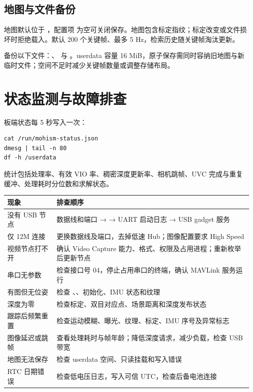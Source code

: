 \subsection{地图与文件备份}
地图默认位于 ，配置项  为空可关闭保存。地图包含标定指纹；标定改变或文件损坏时拒绝载入。默认 200 个关键帧、最多 5 Hz，检索历史随关键帧淘汰更新。

备份以下文件：、 与 。userdata 容量 16 MiB，原子保存需同时容纳旧地图与新临时文件；空间不足时减少关键帧数量或调整存储布局。
\newpage
\section{状态监测与故障排查}
板端状态每 5 秒写入一次：
\begin{lstlisting}
cat /run/mohism-status.json
dmesg | tail -n 80
df -h /userdata
\end{lstlisting}
统计包括处理率、有效 VIO 率、稠密深度更新率、相机跳帧、UVC 完成与重复缓冲、处理耗时分位数和求解状态。

\par\noindent\begin{tabularx}{\linewidth}{@{}p{30mm}Y@{}}\toprule
现象 & 排查顺序\\\midrule
没有 USB 节点 & 数据线和端口 →  → UART 启动日志 → USB gadget 服务\\
仅 12M 连接 & 更换数据线及端口，去掉低速 Hub；图像配置要求 High Speed\\
视频节点打不开 & 确认 Video Capture 能力、格式、权限及占用进程；重新枚举后更新节点\\
串口无参数 & 检查接口号 04，停止占用串口的终端，确认 MAVLink 服务运行\\
有图但无位姿 & 检查 、、初始化、IMU 状态和纹理\\
深度为零 & 检查标定、双目对应点、场景距离和深度发布状态\\
跟踪后频繁重置 & 检查运动模糊、曝光、纹理、标定、IMU 序号及异常标志\\
图像延迟或跳帧 & 查看处理耗时与帧年龄；降低深度请求，减少负载，检查 USB 带宽\\
地图无法保存 & 检查 userdata 空间、只读挂载和写入错误\\
RTC 日期错误 & 检查低电压日志，写入可信 UTC，检查后备电池连接\\\bottomrule
\end{tabularx}\par

